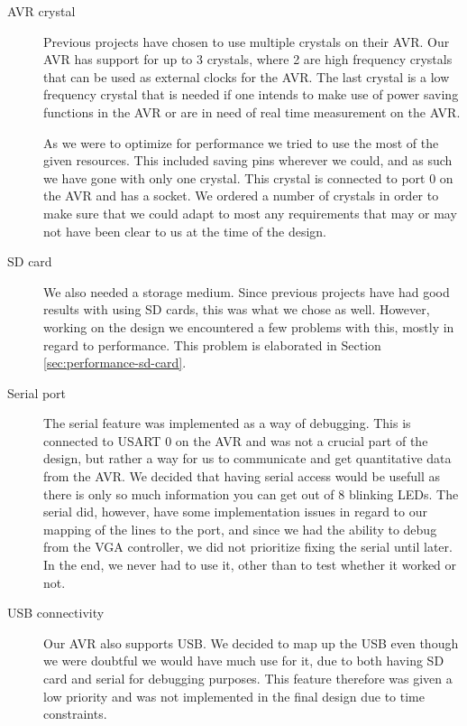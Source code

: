\begin{description}

\item[AVR crystal] \hfill

Previous projects have chosen to use multiple crystals on their AVR. Our AVR has support for up to 3 crystals, where 2 are high frequency crystals that can be used as external clocks for the AVR. The last crystal is a low frequency crystal that is needed if one intends to make use of power saving functions in the AVR or are in need of real time measurement on the AVR. 

As we were to optimize for performance we tried to use the most of the given resources. This included saving pins wherever we could, and as such we have gone with only one crystal. This crystal is connected to port 0 on the AVR and has a socket. We ordered a number of crystals in order to make sure that we could adapt to most any requirements that may or may not have been clear to us at the time of the design.

\item[SD card]  \hfill %

We also needed a storage medium. Since previous projects have had good results with
using \ac{SD} cards, this was what we chose as well. However, working on the
design we encountered a few problems with this, mostly in
regard to performance. This problem is elaborated in Section
\ref{sec:performance-sd-card}.

\item[Serial port]  \hfill

The serial feature was implemented as a way of debugging. This is connected to
\ac{USART} 0 on the AVR and was not a crucial part of the design, but rather a way for us to communicate and get quantitative data from the AVR. We decided that having serial access would be usefull as there is only so much information you can get out of 8 blinking LEDs. The serial did, however, have some implementation issues in regard to our mapping of the lines to the port, and since we had the ability to debug from the VGA controller, we did not prioritize fixing the serial until later. In the end, we never had to use it, other than to test whether it worked or not.

\item[USB connectivity]  \hfill 

Our AVR also supports \ac{USB}. We decided to map up the \ac{USB} even though we were doubtful we would have much use for it, due to both having \ac{SD} card and serial for debugging purposes. This feature therefore was given a low priority and was not implemented in the final design due to time constraints.
 

\end{description}
